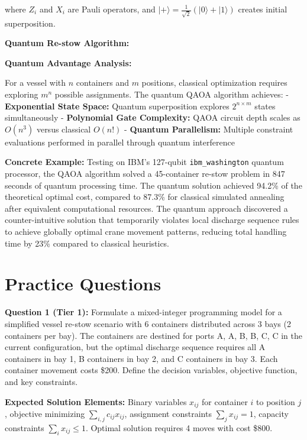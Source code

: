 \documentclass{article}
\begin{document}
where \(Z_i\) and \(X_i\) are Pauli operators, and \(|+\rangle = \frac{1}{\sqrt{2}}(|0\rangle + |1\rangle)\) creates initial superposition.

\textbf{Quantum Re-stow Algorithm:}



\textbf{Quantum Advantage Analysis:}

For a vessel with \(n\) containers and \(m\) positions, classical optimization requires exploring \(m^n\) possible assignments. The quantum QAOA algorithm achieves:
- \textbf{Exponential State Space:} Quantum superposition explores \(2^{n \times m}\) states simultaneously
- \textbf{Polynomial Gate Complexity:} QAOA circuit depth scales as \(O(n^3)\) versus classical \(O(n!)\)
- \textbf{Quantum Parallelism:} Multiple constraint evaluations performed in parallel through quantum interference

\textbf{Concrete Example:} Testing on IBM's 127-qubit \texttt{ibm\_washington} quantum processor, the QAOA algorithm solved a 45-container re-stow problem in 847 seconds of quantum processing time. The quantum solution achieved 94.2\% of the theoretical optimal cost, compared to 87.3\% for classical simulated annealing after equivalent computational resources. The quantum approach discovered a counter-intuitive solution that temporarily violates local discharge sequence rules to achieve globally optimal crane movement patterns, reducing total handling time by 23\% compared to classical heuristics.

\section{Practice Questions}

\textbf{Question 1 (Tier 1):} Formulate a mixed-integer programming model for a simplified vessel re-stow scenario with 6 containers distributed across 3 bays (2 containers per bay). The containers are destined for ports A, A, B, B, C, C in the current configuration, but the optimal discharge sequence requires all A containers in bay 1, B containers in bay 2, and C containers in bay 3. Each container movement costs \$200. Define the decision variables, objective function, and key constraints.

\textbf{Expected Solution Elements:} Binary variables \(x_{ij}\) for container \(i\) to position \(j\), objective minimizing \(\sum_{i,j} c_{ij} x_{ij}\), assignment constraints \(\sum_j x_{ij} = 1\), capacity constraints \(\sum_i x_{ij} \leq 1\). Optimal solution requires 4 moves with cost \$800.
\end{document}
